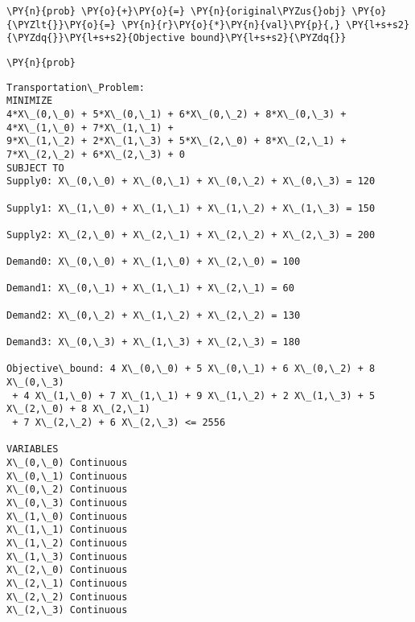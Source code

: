     \begin{tcolorbox}[breakable, size=fbox, boxrule=1pt, pad at break*=1mm,colback=cellbackground, colframe=cellborder]
\begin{Verbatim}[commandchars=\\\{\}]
\PY{n}{prob} \PY{o}{+}\PY{o}{=} \PY{n}{original\PYZus{}obj} \PY{o}{\PYZlt{}}\PY{o}{=} \PY{n}{r}\PY{o}{*}\PY{n}{val}\PY{p}{,} \PY{l+s+s2}{\PYZdq{}}\PY{l+s+s2}{Objective bound}\PY{l+s+s2}{\PYZdq{}}
\end{Verbatim}
\end{tcolorbox}

    \begin{tcolorbox}[breakable, size=fbox, boxrule=1pt, pad at break*=1mm,colback=cellbackground, colframe=cellborder]
\begin{Verbatim}[commandchars=\\\{\}]
\PY{n}{prob}
\end{Verbatim}
\end{tcolorbox}

            \begin{tcolorbox}[breakable, size=fbox, boxrule=.5pt, pad at break*=1mm, opacityfill=0]
\begin{Verbatim}[commandchars=\\\{\}]
Transportation\_Problem:
MINIMIZE
4*X\_(0,\_0) + 5*X\_(0,\_1) + 6*X\_(0,\_2) + 8*X\_(0,\_3) + 4*X\_(1,\_0) + 7*X\_(1,\_1) +
9*X\_(1,\_2) + 2*X\_(1,\_3) + 5*X\_(2,\_0) + 8*X\_(2,\_1) + 7*X\_(2,\_2) + 6*X\_(2,\_3) + 0
SUBJECT TO
Supply0: X\_(0,\_0) + X\_(0,\_1) + X\_(0,\_2) + X\_(0,\_3) = 120

Supply1: X\_(1,\_0) + X\_(1,\_1) + X\_(1,\_2) + X\_(1,\_3) = 150

Supply2: X\_(2,\_0) + X\_(2,\_1) + X\_(2,\_2) + X\_(2,\_3) = 200

Demand0: X\_(0,\_0) + X\_(1,\_0) + X\_(2,\_0) = 100

Demand1: X\_(0,\_1) + X\_(1,\_1) + X\_(2,\_1) = 60

Demand2: X\_(0,\_2) + X\_(1,\_2) + X\_(2,\_2) = 130

Demand3: X\_(0,\_3) + X\_(1,\_3) + X\_(2,\_3) = 180

Objective\_bound: 4 X\_(0,\_0) + 5 X\_(0,\_1) + 6 X\_(0,\_2) + 8 X\_(0,\_3)
 + 4 X\_(1,\_0) + 7 X\_(1,\_1) + 9 X\_(1,\_2) + 2 X\_(1,\_3) + 5 X\_(2,\_0) + 8 X\_(2,\_1)
 + 7 X\_(2,\_2) + 6 X\_(2,\_3) <= 2556

VARIABLES
X\_(0,\_0) Continuous
X\_(0,\_1) Continuous
X\_(0,\_2) Continuous
X\_(0,\_3) Continuous
X\_(1,\_0) Continuous
X\_(1,\_1) Continuous
X\_(1,\_2) Continuous
X\_(1,\_3) Continuous
X\_(2,\_0) Continuous
X\_(2,\_1) Continuous
X\_(2,\_2) Continuous
X\_(2,\_3) Continuous
\end{Verbatim}
\end{tcolorbox}
        
